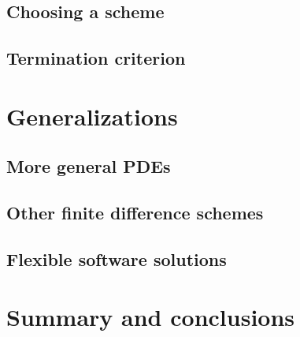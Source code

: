 \subsection{Choosing a scheme}
\subsection{Termination criterion}

\section{Generalizations}

\subsection{More general PDEs}

\subsection{Other finite difference schemes}

\subsection{Flexible software solutions}

\section{Summary and conclusions}